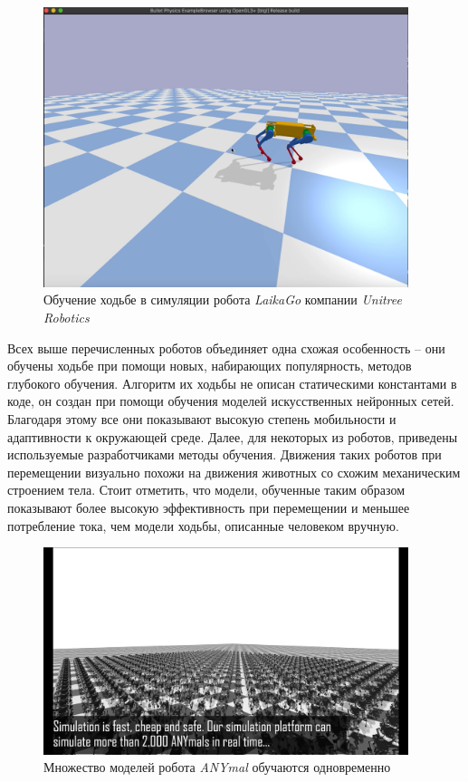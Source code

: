\begin{figure}[h]
    \centering
    \includegraphics[width=0.95\textwidth]{chapter_intro/figure5.png}
    \caption{Обучение ходьбе в симуляции робота \textit{LaikaGo} компании \textit{ Unitree Robotics} }
    \label{fig:intro4}
\end{figure}

Всех выше перечисленных роботов объединяет одна схожая особенность -- они обучены ходьбе при помощи новых, набирающих популярность, методов глубокого обучения. Алгоритм их ходьбы не описан статическими константами в коде, он создан при помощи обучения моделей искусственных нейронных сетей. Благодаря этому все они показывают высокую степень мобильности и адаптивности к окружающей среде. Далее, для некоторых из роботов, приведены используемые разработчиками методы обучения. Движения таких роботов при перемещении визуально похожи на движения животных со схожим механическим строением тела. 
Стоит отметить, что модели, обученные таким образом показывают более высокую эффективность при перемещении \cite{Hwangbo2019} и меньшее потребление тока, чем модели ходьбы, описанные человеком вручную.

\begin{figure}[h!]
    \centering
    \includegraphics[width=0.95\textwidth]{chapter_intro/figure6.png}
    \caption{Множество моделей робота \textit{ANYmal} обучаются одновременно }
    \label{fig:intro5}
\end{figure}

